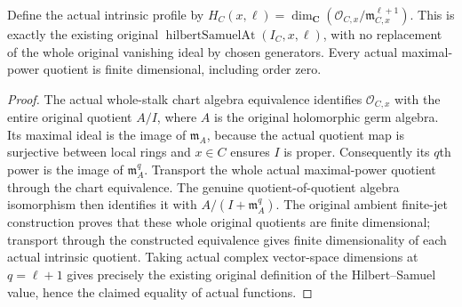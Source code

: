 \begin{theorem}
\label{hir:actual-analytic-subspace-intrinsic-hs-dictionary}
\leanok
Define the actual intrinsic profile by
$H_C(x,\ell)=\dim_{\mathbf C}(\mathcal O_{C,x}/\mathfrak m_{C,x}^{\ell+1})$.
This is exactly the existing original
$\operatorname{hilbertSamuelAt}(I_C,x,\ell)$, with no replacement of the
whole original vanishing ideal by chosen generators. Every actual maximal-power quotient is finite dimensional,
including order zero.
\end{theorem}
\begin{proof}
The actual whole-stalk chart algebra equivalence identifies
$\mathcal O_{C,x}$ with the entire original quotient $A/I$, where $A$ is
the original holomorphic germ algebra. Its maximal ideal is the image of
$\mathfrak m_A$, because the actual quotient map is surjective between
local rings and $x\in C$ ensures $I$ is proper. Consequently its $q$th power
is the image of $\mathfrak m_A^q$. Transport the whole actual maximal-power
quotient through the chart equivalence. The genuine quotient-of-quotient
algebra isomorphism then identifies it with $A/(I+\mathfrak m_A^q)$.
The original ambient finite-jet construction proves that these whole original
quotients are finite dimensional; transport through the constructed equivalence
gives finite dimensionality of each actual intrinsic quotient. Taking actual
complex vector-space dimensions at $q=\ell+1$ gives precisely
the existing original definition of the Hilbert--Samuel value, hence the
claimed equality of actual functions.
\end{proof}

